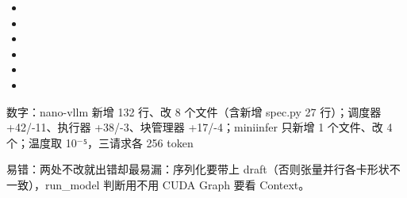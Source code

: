 \documentclass[UTF8,10.5pt,openany]{ctexbook}
\newcommand{\meta}[2]{\vspace{1pt}\begingroup\sloppy\raggedright{\sffamily\footnotesize\color{grayt}#1：#2}\par\endgroup}
\begin{document}
\begin{itemize}[leftmargin=1.35em,itemsep=2.2pt,topsep=1pt,parsep=0pt]
\item \begingroup{}\endgroup
\item \begingroup{}\endgroup
\item \begingroup{}\endgroup
\item \begingroup{}\endgroup
\item \begingroup{}\endgroup
\item \begingroup{}\endgroup
\end{itemize}
\meta{数字}{nano-vllm 新增 132 行、改 8 个文件（含新增 spec.py 27 行）；调度器 +42/-11、执行器 +38/-3、块管理器 +17/-4；miniinfer 只新增 1 个文件、改 4 个；温度取 10$^-$⁵，三请求各 256 token}
\meta{易错}{两处不改就出错却最易漏：序列化要带上 draft（否则张量并行各卡形状不一致），run\_model 判断用不用 CUDA Graph 要看 Context。}
\end{document}
